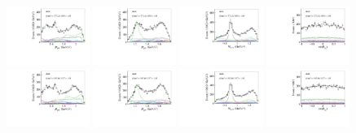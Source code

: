\begin{figure}[htbp]
    \includegraphics[width=0.24\textwidth]{figure/pwa_nominal/s2_m_R_BC.pdf}
    \includegraphics[width=0.24\textwidth]{figure/pwa_nominal/s2_m_R_BD.pdf}
    \includegraphics[width=0.24\textwidth]{figure/pwa_nominal/s2_m_R_CD.pdf}
    \includegraphics[width=0.24\textwidth]{figure/pwa_nominal/s2_epemDSID_Lmdc_cos_beta.pdf} \\
    \includegraphics[width=0.24\textwidth]{figure/pwa_nominal/s3_m_R_BC.pdf}
    \includegraphics[width=0.24\textwidth]{figure/pwa_nominal/s3_m_R_BD.pdf}
    \includegraphics[width=0.24\textwidth]{figure/pwa_nominal/s3_m_R_CD.pdf}
    \includegraphics[width=0.24\textwidth]{figure/pwa_nominal/s3_epemDSID_Lmdc_cos_beta.pdf} \\

\end{figure}
